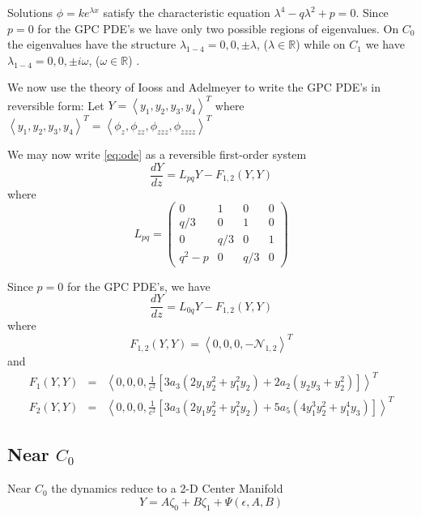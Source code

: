 Solutions $\phi = k e^{\lambda x}$ satisfy the characteristic equation $\lambda^4 - q \lambda^2 + p = 0 $. Since $p=0$ for the GPC PDE's we have only two possible regions of eigenvalues. On $C_0$ the eigenvalues have the structure 
$\lambda_{1-4} = 0,0,\pm \lambda$, ($\lambda \in \mathbb{R}$) while on $C_1$ we have 
$\lambda_{1-4} = 0,0,\pm i \omega $, ($\omega \in \mathbb{R} $) .



We now use the theory of Iooss and Adelmeyer \cite{IA} to write the GPC PDE's in reversible form:
Let $Y=\left<y_1,y_2,y_3,y_4\right>^T$ where $\left<y_1,y_2,y_3,y_4\right>^T = \left<\phi_z,\phi_{zz}, \phi_{zzz}, \phi_{zzzz} \right>^T $

We may now write \eqref{eq:ode} as a reversible first-order system 
\begin{equation}\frac{ dY }{ dz } = L_{pq} Y - F_{1,2}(Y,Y) \end{equation}
 where
\begin{equation}
L_{pq} = \left( 
\begin{array}{cccc}
0&1&0&0\\
q/3&0&1&0\\
0&q/3&0&1\\
q^2 - p &0&q/3&0 \end{array} \right) \end{equation}

Since $p=0$ for the GPC PDE's, we have 
\begin{equation} 
 \frac{ dY }{ dz } = L_{0q} Y - F_{1,2}(Y,Y) 
\end{equation}
where 
\begin{equation}
F_{1,2}(Y,Y) = \left<0,0,0,-\mathcal{N}_{1,2} \right>^T
\end{equation}
and
\begin{subequations}
\begin{eqnarray}
F_1(Y,Y) &=& \left<0,0,0,\frac{1}{c^2}\left[ 3 a_3 \left( 2 y_1 y_2^2 + y_1^2 y_2\right)+ 2 a_2 \left( y_2 y_3  + y_2^2\right)  \right]\right>^T\\
F_2(Y,Y) &=& \left<0,0,0,\frac{1}{c^2}\left[ 3 a_3 \left( 2 y_1 y_2^2 + y_1^2 y_2\right)+ 5 a_5 \left(4 y_1^3 y_2^2 +  y_1^4 y_3 \right) \right]\right>^T
\end{eqnarray}
\end{subequations}

\subsection{ Near $C_0$ }
Near $C_0$ the dynamics reduce to a 2-D Center Manifold
\begin{equation} Y = A \zeta_0 + B \zeta_1 + \Psi(\epsilon,A,B)
\end{equation}

